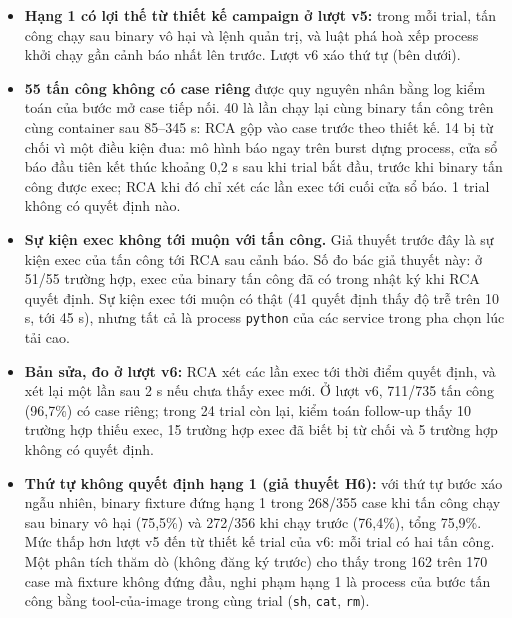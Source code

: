 \begin{itemize}
\tightlist
\item
  \textbf{Hạng 1 có lợi thế từ thiết kế campaign ở lượt v5:} trong mỗi trial, tấn công chạy sau binary vô hại và lệnh quản trị, và luật phá hoà xếp process khởi chạy gần cảnh báo nhất lên trước. Lượt v6 xáo thứ tự (bên dưới).
\item
  \textbf{55 tấn công không có case riêng} được quy nguyên nhân bằng log kiểm toán của bước mở case tiếp nối. 40 là lần chạy lại cùng binary tấn công trên cùng container sau 85--345 s: RCA gộp vào case trước theo thiết kế. 14 bị từ chối vì một điều kiện đua: mô hình báo ngay trên burst dựng process, cửa sổ báo đầu tiên kết thúc khoảng 0,2 s sau khi trial bắt đầu, trước khi binary tấn công được exec; RCA khi đó chỉ xét các lần exec tới cuối cửa sổ báo. 1 trial không có quyết định nào.
\item
  \textbf{Sự kiện exec không tới muộn với tấn công.} Giả thuyết trước đây là sự kiện exec của tấn công tới RCA sau cảnh báo. Số đo bác giả thuyết này: ở 51/55 trường hợp, exec của binary tấn công đã có trong nhật ký khi RCA quyết định. Sự kiện exec tới muộn có thật (41 quyết định thấy độ trễ trên 10 s, tới 45 s), nhưng tất cả là process \texttt{python} của các service trong pha chọn lúc tải cao.
\item
  \textbf{Bản sửa, đo ở lượt v6:} RCA xét các lần exec tới thời điểm quyết định, và xét lại một lần sau 2 s nếu chưa thấy exec mới. Ở lượt v6, 711/735 tấn công (96,7\%) có case riêng; trong 24 trial còn lại, kiểm toán follow-up thấy 10 trường hợp thiếu exec, 15 trường hợp exec đã biết bị từ chối và 5 trường hợp không có quyết định.
\item
  \textbf{Thứ tự không quyết định hạng 1 (giả thuyết H6):} với thứ tự bước xáo ngẫu nhiên, binary fixture đứng hạng 1 trong 268/355 case khi tấn công chạy sau binary vô hại (75,5\%) và 272/356 khi chạy trước (76,4\%), tổng 75,9\%. Mức thấp hơn lượt v5 đến từ thiết kế trial của v6: mỗi trial có hai tấn công. Một phân tích thăm dò (không đăng ký trước) cho thấy trong 162 trên 170 case mà fixture không đứng đầu, nghi phạm hạng 1 là process của bước tấn công bằng tool-của-image trong cùng trial (\texttt{sh}, \texttt{cat}, \texttt{rm}).
\end{itemize}

